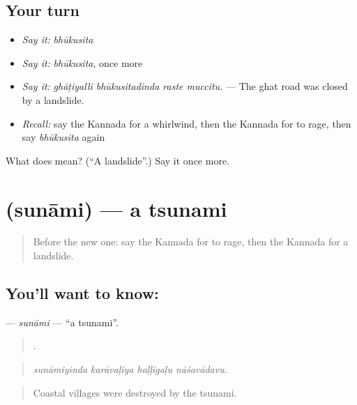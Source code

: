 \subsection*{Your turn}
\begin{itemize}
\raggedright
  \item \emph{Say it:} \emph{bhūkusita}
  \item \emph{Say it:} \emph{bhūkusita}, once more
  \item \emph{Say it:} \emph{ghāṭiyalli bhūkusitadinda raste muccitu.} — The ghat road was closed by a landslide.
  \item \emph{Recall:} say the Kannada for a whirlwind, then the Kannada for to rage, then say \emph{bhūkusita} again
\end{itemize}

\begin{tcolorbox}[breakable,colback=teal!4,colframe=teal!35!black,title={Before you move on}]
What does  mean? (\textquotedblleft{}A landslide\textquotedblright{}.) Say it once more.
\end{tcolorbox}
\section[\texorpdfstring{\kn{ಸುನಾಮಿ} (sunāmi)}{ಸುನಾಮಿ (sunāmi)}]{ (sunāmi) — a tsunami}

\label{lesson:KA-C487-sunami}



\begin{quote}
Before the new one: say the Kannada for to rage, then the Kannada for a landslide.
\end{quote}

\subsection*{You'll want to know: }
\textbf{} — \emph{sunāmi} — \textquotedblleft{}a tsunami\textquotedblright{}.

\begin{quote}
   .
\end{quote}

\begin{quote}
\emph{sunāmiyinda karāvaḷiya haḷḷigaḷu nāśavādavu.}
\end{quote}

\begin{quote}
Coastal villages were destroyed by the tsunami.
\end{quote}

